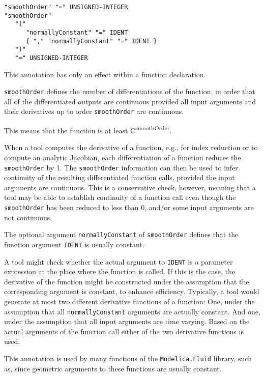 \begin{annotationdefinition}[smoothOrder]
\begin{synopsis}[grammar]\begin{lstlisting}
"smoothOrder" "=" UNSIGNED-INTEGER
"smoothOrder"
   "("
      "normallyConstant" "=" IDENT
      { "," "normallyConstant" "=" IDENT }
   ")"
   "=" UNSIGNED-INTEGER
\end{lstlisting}\end{synopsis}
\begin{semantics}
This annotation has only an effect within a function declaration.

{\lstinline!smoothOrder!} defines the number of differentiations of the function, in order that all of the differentiated outputs are continuous provided all input arguments and their derivatives up to order {\lstinline!smoothOrder!} are continuous.

\begin{nonnormative}
This means that the function is at least C\textsuperscript{smoothOrder}.

When a tool computes the derivative of a function, e.g., for index reduction or to compute an analytic Jacobian, each differentiation of a function reduces the \lstinline!smoothOrder! by 1.
The \lstinline!smoothOrder! information can then be used to infer continuity of the resulting differentiated function calls, provided the input arguments are continuous.
This is a conservative check, however, meaning that a tool may be able to establish continuity of a function call even though the \lstinline!smoothOrder! has been reduced to less than 0, and/or some input arguments are not continuous.
\end{nonnormative}

The optional argument {\lstinline!normallyConstant!} of {\lstinline!smoothOrder!} defines that the function argument {\lstinline!IDENT!} is usually constant.

\begin{nonnormative}
A tool might check whether the actual argument to {\lstinline!IDENT!} is a parameter expression at the place where the function is called.
If this is the case, the derivative of the function might be constructed under the assumption that the corresponding argument is constant, to enhance efficiency.
Typically, a tool would generate at most two different derivative functions of a function:
One, under the assumption that all {\lstinline!normallyConstant!} arguments are actually constant.
And one, under the assumption that all input arguments are time varying.
Based on the actual arguments of the function call either of the two derivative functions is used.

This annotation is used by many functions of the {\lstinline!Modelica.Fluid!} library, such as, since geometric arguments to these functions are usually constant.
\end{nonnormative}
\end{semantics}
\end{annotationdefinition}

